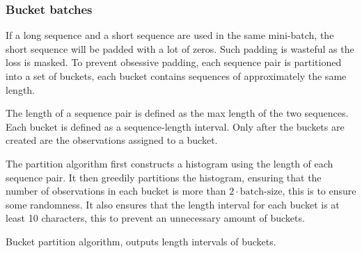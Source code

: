 \subsubsection{Bucket batches}

If a long sequence and a short sequence are used in the same mini-batch, the short sequence will be padded with a lot of zeros. Such padding is wasteful as the loss is masked. To prevent obsessive padding, each sequence pair is partitioned into a set of buckets, each bucket contains sequences of approximately the same length.

The length of a sequence pair is defined as the max length of the two sequences. Each bucket is defined as a sequence-length interval. Only after the buckets are created are the observations assigned to a bucket.

The partition algorithm first constructs a histogram using the length of each sequence pair. It then greedily partitions the histogram, ensuring that the number of observations in each bucket is more than $2 \cdot \text{batch-size}$, this is to ensure some randomness. It also ensures that the length interval for each bucket is at least 10 characters, this to prevent an unnecessary amount of buckets.

\begin{algorithm}[H]
  \caption{Bucket partition algorithm, outputs length intervals of buckets.}
  \begin{algorithmic}[1]

         
         
        \Else
           \State {} 
            
        \EndIf
      \EndFor
      \State {}
    \EndFunction
  \end{algorithmic}
\end{algorithm}

